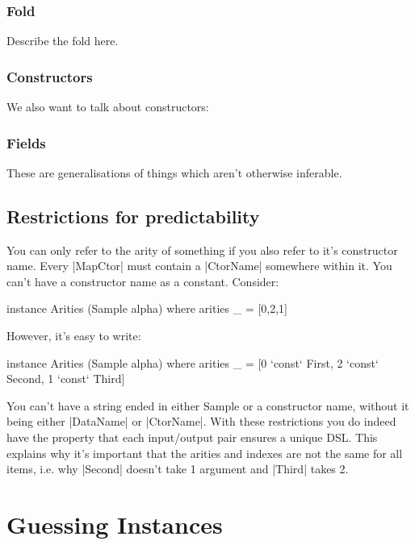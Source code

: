 \documentclass[preprint]{sigplanconf}
\begin{document}
\subsubsection{Fold}

Describe the fold here.

\subsubsection{Constructors}

We also want to talk about constructors:

\subsubsection{Fields}

These are generalisations of things which aren't otherwise inferable.



\subsection{Restrictions for predictability}

You can only refer to the arity of something if you also refer to it's constructor name. Every |MapCtor| must contain a |CtorName| somewhere within it. You can't have a constructor name as a constant. Consider:

\begin{code}
instance Arities (Sample alpha) where
    arities _ = [0,2,1]
\end{code}

However, it's easy to write:

\begin{code}
instance Arities (Sample alpha) where
    arities _ = [0 `const` First{}, 2 `const` Second{}, 1 `const` Third{}]
\end{code}

You can't have a string ended in either Sample or a constructor name, without it being either |DataName| or |CtorName|.
With these restrictions you do indeed have the property that each input/output pair ensures a unique DSL. This explains why it's important that the arities and indexes are not the same for all items, i.e. why |Second| doesn't take 1 argument and |Third| takes 2.

\section{Guessing Instances}
\label{sec:guess}
\end{document}
